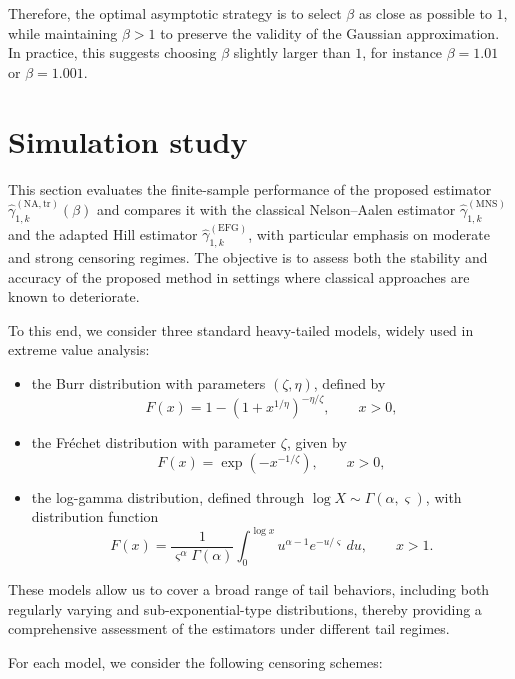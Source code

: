 \documentclass[reqno,openbib,runningheads,a4paper,12pt]{amsart}%
\begin{document}
\noindent Therefore, the optimal asymptotic strategy is to select $\beta$ as
close as possible to $1$, while maintaining $\beta>1$ to preserve the validity
of the Gaussian approximation. In practice, this suggests choosing $\beta$
slightly larger than $1$, for instance $\beta=1.01$ or $\beta=1.001$.

\section{\textbf{Simulation study}\label{sec3}}

\noindent This section evaluates the finite-sample performance of the proposed
estimator $\widehat{\gamma}_{1,k}^{(\mathrm{NA,tr})}(\beta)$ and compares it
with the classical Nelson--Aalen estimator $\widehat{\gamma}_{1,k}%
^{(\mathrm{MNS})}$ and the adapted Hill estimator $\widehat{\gamma}%
_{1,k}^{(\mathrm{EFG})}$, with particular emphasis on moderate and strong
censoring regimes. The objective is to assess both the stability and accuracy
of the proposed method in settings where classical approaches are known to
deteriorate.\smallskip

\noindent To this end, we consider three standard heavy-tailed models, widely
used in extreme value analysis:

\begin{itemize}
\item the Burr distribution with parameters $(\zeta,\eta)$, defined by
\[
F(x)=1-\left(  1+x^{1/\eta}\right)  ^{-\eta/\zeta},\qquad x>0,
\]


\item the Fr\'{e}chet distribution with parameter $\zeta$, given by
\[
F(x)=\exp\!\left(  -x^{-1/\zeta}\right)  ,\qquad x>0,
\]


\item the log-gamma distribution, defined through $\log X\sim\Gamma
(\alpha,\varsigma)$, with distribution function
\[
F(x)=\frac{1}{\varsigma^{\alpha}\Gamma(\alpha)}\int_{0}^{\log x}u^{\alpha
-1}e^{-u/\varsigma}\,du,\qquad x>1.
\]

\end{itemize}

\noindent These models allow us to cover a broad range of tail behaviors,
including both regularly varying and sub-exponential-type distributions,
thereby providing a comprehensive assessment of the estimators under different
tail regimes.\smallskip

\noindent For each model, we consider the following censoring schemes:
\end{document}
